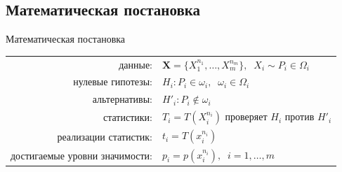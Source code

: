 \documentclass[9pt,pdf,utf8,hyperref={unicode},aspectratio=169]{beamer}
\begin{document}
\subsection{Математическая постановка}
\begin{frame}{Математическая постановка}
    \vspace{-10pt}
    \begin{center}
        \begin{tabular}{ r l }
                данные:                        & $\mathbf{X}=\{X_1^{n_1},\ldots,X_m^{n_m}\}, \;\; X_i \sim P_i \in \Omega_i$         \\
                нулевые гипотезы:              & $H_i\colon P_i\in\omega_i, \;\; \omega_i\in\Omega_i$ \\
                альтернативы:                  & $H'_i\colon P_i\notin\omega_i$ \\
                статистики:                    & $T_i=T\left(X_i^{n_i}\right)$ проверяет $H_i$ против $H'_i$ \\
                реализации статистик:          & $t_i=T\left(x_i^{n_i}\right)$ \\
                достигаемые уровни значимости: & $p_i=p\left(x_i^{n_i}\right), \;\; i=1,\ldots,m$
        \end{tabular}
    \end{center}


\end{frame}
\end{document}
